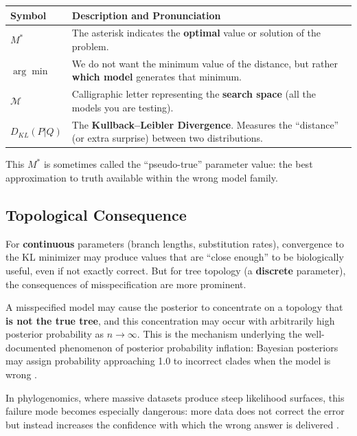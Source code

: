 \begin{center}
\renewcommand{\arraystretch}{1.5}
\begin{tabular}{lp{10cm}}
\hline
\textbf{Symbol} & \textbf{Description and Pronunciation} \\ \hline
$M^*$ & The asterisk indicates the \textbf{optimal} value or solution of the problem. \\
$\arg\min$ & We do not want the minimum value of the distance, but rather \textbf{which model} generates that minimum. \\
$\mathcal{M}$ & Calligraphic letter representing the \textbf{search space} (all the models you are testing). \\
$D_{KL}(P|Q)$ & The \textbf{Kullback--Leibler Divergence}. Measures the ``distance'' (or extra surprise) between two distributions. \\ \hline
\end{tabular}
\end{center}

This $M^*$ is sometimes called the ``pseudo-true'' parameter value: the best approximation to truth available within the wrong model family.

\subsection{Topological Consequence}

For \textbf{continuous} parameters (branch lengths, substitution rates), convergence to the KL minimizer may produce values that are ``close enough'' to be biologically useful, even if not exactly correct. But for tree topology (a \textbf{discrete} parameter), the consequences of misspecification are more prominent.

A misspecified model may cause the posterior to concentrate on a topology that \textbf{is not the true tree}, and this concentration may occur with arbitrarily high posterior probability as $n \to \infty$. This is the mechanism underlying the well-documented phenomenon of posterior probability inflation: Bayesian posteriors may assign probability approaching 1.0 to incorrect clades when the model is wrong \parencite{suzuki2002,cummings2003,yang2007}.

In phylogenomics, where massive datasets produce steep likelihood surfaces, this failure mode becomes especially dangerous: more data does not correct the error but instead increases the confidence with which the wrong answer is delivered \parencite{kumar2012}.

